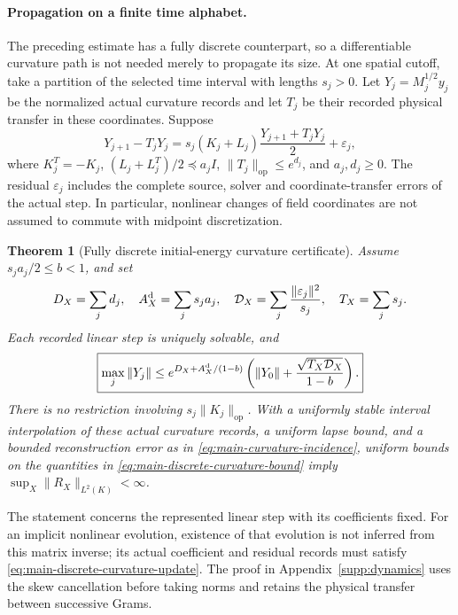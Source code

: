 \documentclass[11pt]{article}
\newtheorem{theorem}{Theorem}[section]
\theoremstyle{definition}
\theoremstyle{remark}
\newcommand{\op}{\mathrm{op}}
\begin{document}
\paragraph{Propagation on a finite time alphabet.}
The preceding estimate has a fully discrete counterpart, so a differentiable
curvature path is not needed merely to propagate its size.  At one spatial
cutoff, take a partition of the selected time interval with lengths $s_j>0$.
Let $Y_j=M_j^{1/2}y_j$ be the normalized actual curvature records and
let $T_j$ be their recorded physical transfer in these coordinates.  Suppose
\begin{equation}
 Y_{j+1}-T_jY_j
 =s_j(K_j+L_j)\frac{Y_{j+1}+T_jY_j}{2}+\varepsilon_j,
 \label{eq:main-discrete-curvature-update}
\end{equation}
where $K_j^T=-K_j$, $(L_j+L_j^T)/2\preceq a_jI$,
$\|T_j\|_{\op}\le e^{d_j}$, and $a_j,d_j\ge0$.  The residual
$\varepsilon_j$ includes the complete source, solver and coordinate-transfer
errors of the actual step.  In particular, nonlinear changes of field
coordinates are not assumed to commute with midpoint discretization.

\begin{theorem}[Fully discrete initial-energy curvature certificate]
\label{thm:main-discrete-curvature}
Assume $s_ja_j/2\le b<1$, and set
\begin{equation}
 D_X=\sum_jd_j,\quad A_X^{\rm d}=\sum_js_ja_j,\quad
 \mathcal D_X=\sum_j\frac{\|\varepsilon_j\|^2}{s_j},\quad
 T_X=\sum_js_j.
 \label{eq:main-discrete-curvature-budgets}
\end{equation}
Each recorded linear step is uniquely solvable, and
\begin{equation}
 \boxed{\max_j\|Y_j\|
 \le e^{D_X+A_X^{\rm d}/(1-b)}
       \left(\|Y_0\|+\frac{\sqrt{T_X\mathcal D_X}}{1-b}\right).}
 \label{eq:main-discrete-curvature-bound}
\end{equation}
There is no restriction involving $s_j\|K_j\|_{\op}$.  With a uniformly
stable interval interpolation of these actual curvature records, a uniform
lapse bound, and a bounded reconstruction error as in
\eqref{eq:main-curvature-incidence}, uniform bounds on the quantities in
\eqref{eq:main-discrete-curvature-bound} imply
$\sup_X\|R_X\|_{L^2(K)}<\infty$.
\end{theorem}

The statement concerns the represented linear step with its coefficients
fixed.  For an implicit nonlinear evolution, existence of that evolution is
not inferred from this matrix inverse; its actual coefficient and residual
records must satisfy \eqref{eq:main-discrete-curvature-update}.
The proof in Appendix~\ref{supp:dynamics} uses the skew cancellation before
taking norms and retains the physical transfer between successive Grams.
\end{document}
